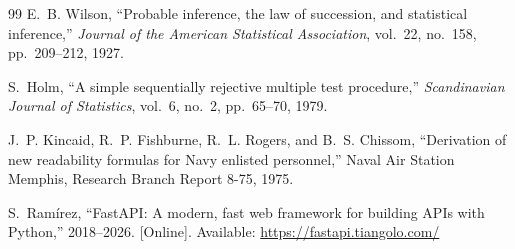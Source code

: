 \begin{thebibliography}{99}
E.~B. Wilson,
``Probable inference, the law of succession, and statistical inference,''
\emph{Journal of the American Statistical Association}, vol.~22, no.~158,
pp.~209--212, 1927.

S.~Holm,
``A simple sequentially rejective multiple test procedure,''
\emph{Scandinavian Journal of Statistics}, vol.~6, no.~2, pp.~65--70, 1979.

J.~P. Kincaid, R.~P. Fishburne, R.~L. Rogers, and B.~S. Chissom,
``Derivation of new readability formulas for Navy enlisted personnel,''
Naval Air Station Memphis, Research Branch Report 8-75, 1975.

S.~Ram\'{i}rez,
``FastAPI: A modern, fast web framework for building APIs with Python,''
2018--2026. [Online]. Available: \url{https://fastapi.tiangolo.com/}

\end{thebibliography}
